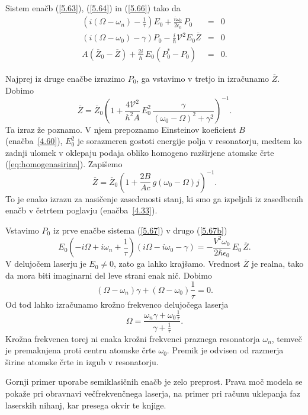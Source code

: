 Sistem enačb (\ref{5.63}), (\ref{5.64}) in (\ref{5.66}) 
tako da 
\begin{eqnarray}
\left(i\left(\Omega - \omega_n\right)-\frac{1}{\tau}\right) E_{0}+\frac{i\omega _{0}}
{2\epsilon _{0}}\,P_{0} &=&0  \label{5.67} \\
\left(i\left(\Omega-\omega_{0}\right)-\gamma\right)P_{0}-\frac{i}{\hbar}\mathcal{V}^{2}
E_{0}\overline{Z} &=&0 \label{5.67b}\\
A\left(\overline{Z}_{0}-\overline{Z}\right)+\frac{2i}{\hbar }\,E_{0}\left(P_{0}^{*}-P_{0}\right) &=&0.
\end{eqnarray}

Najprej iz druge enačbe izrazimo $P_0$, ga vstavimo v tretjo in izračunamo $\overline{Z}$. Dobimo
\begin{equation}  
\label{5.68}
\overline{Z}=\overline{Z}_0\left(1+\frac{4\mathcal{V}^2}{\hbar^2 A}\,E_0^2\, \frac{\gamma}
{\left(\omega_0-\Omega\right)^2+\gamma^2}\right)^{-1}.
\end{equation}
Ta izraz že poznamo. V njem prepoznamo Einsteinov
koeficient $B$ (enačba~\ref{4.60}),
$E_0^2$ je sorazmeren gostoti energije polja v resonatorju, medtem ko 
zadnji ulomek v oklepaju podaja obliko homogeno razširjene atomske
črte (\ref{eq:homogenasirina}). Zapišemo
\begin{equation}  
\label{5.69}
\overline{Z}=\overline{Z}_0\left(1+\frac{2B}{Ac}\,g\left(\omega_0- \Omega\right)j\right)^{-1}.
\end{equation}
To je enako izrazu za nasičenje zasedenosti stanj, ki smo ga
izpeljali iz zasedbenih enačb v četrtem poglavju (enačba~\ref{4.33}).

Vstavimo $P_0$ iz prve enačbe sistema (\ref{5.67}) v drugo (\ref{5.67b})
\begin{equation}  
\label{5.70}
E_0\left(-i\Omega+i\omega_n+\frac{1}{\tau}\right) \left(i\Omega- i\omega_0
-\gamma\right)=-\frac{V^2 \omega_0}{2\hbar\epsilon_0}\,E_0\,\overline{Z}.
\end{equation}
V delujočem laserju je $E_0\ne 0$, zato ga lahko krajšamo. Vrednost $\overline{Z}$ je
realna, tako da mora biti imaginarni del leve strani enak nič. Dobimo
\begin{equation}  
\label{5.71}
\left(\Omega- \omega_n\right)\gamma+\left(\Omega- \omega_0\right)\frac{1}{\tau} = 0.
\end{equation}
Od tod lahko izračunamo krožno frekvenco delujočega laserja 
\begin{equation}  \label{5.72}
\Omega=\frac{\omega_n\gamma+ \omega_0\frac{1}{\tau}}{\gamma + \frac{1}{\tau}}.
\end{equation}
Krožna frekvenca torej ni enaka krožni frekvenci praznega resonatorja $\omega_n$,
temveč je premaknjena proti centru atomske črte $\omega_0$. Premik je
odvisen od razmerja širine atomske črte in izgub v resonatorju.

Gornji primer uporabe semiklasičnih enačb je zelo preprost. Prava moč
modela se pokaže pri obravnavi večfrekvenčnega laserja, na primer pri
računu uklepanja faz laserskih nihanj, kar presega okvir te knjige. 
